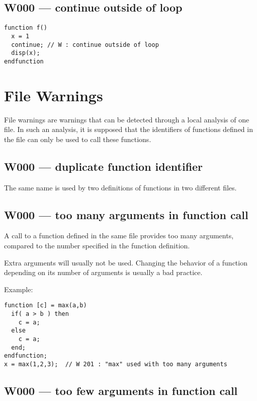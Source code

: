 \subsection{W000 --- continue outside of loop}


\begin{verbatim}
function f()
  x = 1
  continue; // W : continue outside of loop
  disp(x);
endfunction
\end{verbatim}


\section{File Warnings}

File warnings are warnings that can be detected through a local
analysis of one file. In such an analysis, it is supposed that the
identifiers of functions defined in the file can only be used to call
these functions.

\subsection{W000 --- duplicate function identifier}




The same name is used by two definitions of functions in two different
files.



\subsection{W000 --- too many arguments in function call}




A call to a function defined in the same file provides too many
arguments, compared to the number specified in the function definition.



Extra arguments will usually not be used. Changing the behavior of a
function depending on its number of arguments is usually a bad
practice.



Example:\begin{verbatim}
function [c] = max(a,b)
  if( a > b ) then
    c = a;
  else
    c = a;
  end;
endfunction;
x = max(1,2,3);  // W 201 : "max" used with too many arguments
\end{verbatim}




\subsection{W000 --- too few arguments in function call }




